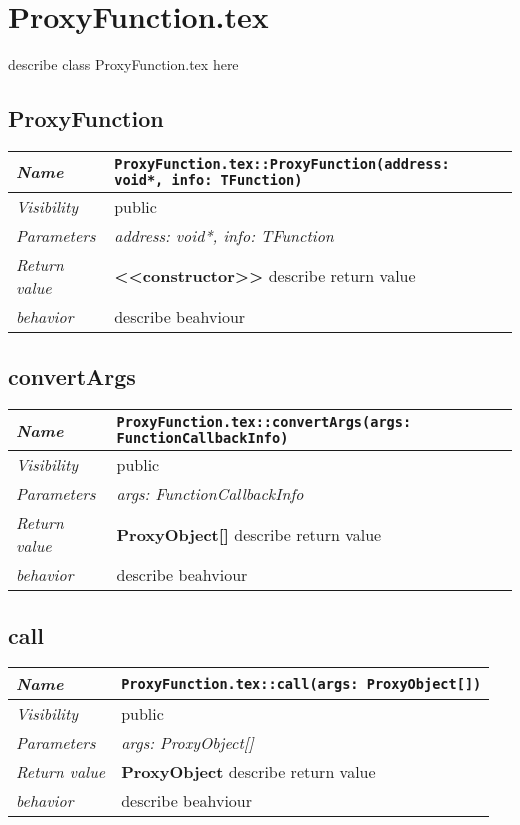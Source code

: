 \chapter{ProxyFunction.tex}
describe class ProxyFunction.tex here
\section{ProxyFunction}
\begin{longtable}{p{3cm} @{\hskip 1cm} p{12cm}}
 \hline
\textit{Name} & \texttt{ProxyFunction.tex::ProxyFunction(address: void*, info: TFunction)}\\
\hline
 \textit{Visibility} & public\\
\hline
\textit{Parameters} & \textit{address: void*, info: TFunction}\\
\hline
\textit{Return value} & \textbf{ <<constructor>>} describe return value\\
  \hline
 \textit{behavior} & describe beahviour \\
\hline
\end{longtable} \pagebreak
 \section{convertArgs}
\begin{longtable}{p{3cm} @{\hskip 1cm} p{12cm}}
 \hline
\textit{Name} & \texttt{ProxyFunction.tex::convertArgs(args: FunctionCallbackInfo)}\\
\hline
 \textit{Visibility} & public\\
\hline
\textit{Parameters} & \textit{args: FunctionCallbackInfo}\\
\hline
\textit{Return value} & \textbf{ ProxyObject[]} describe return value\\
  \hline
 \textit{behavior} & describe beahviour \\
\hline
\end{longtable} \pagebreak
 \section{call}
\begin{longtable}{p{3cm} @{\hskip 1cm} p{12cm}}
 \hline
\textit{Name} & \texttt{ProxyFunction.tex::call(args: ProxyObject[])}\\
\hline
 \textit{Visibility} & public\\
\hline
\textit{Parameters} & \textit{args: ProxyObject[]}\\
\hline
\textit{Return value} & \textbf{ ProxyObject} describe return value\\
  \hline
 \textit{behavior} & describe beahviour \\
\hline
\end{longtable} \pagebreak
